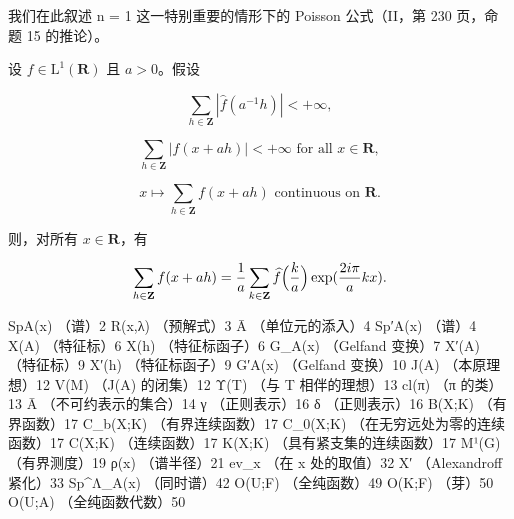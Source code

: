 
我们在此叙述 n = 1 这一特别重要的情形下的 Poisson 公式（II，第 230 页，命题 15 的推论）。

设 \(f\in \mathrm{L}^1 (\mathbf{R})\) 且 \(a > 0\)。假设

\[
\sum_ {h \in \mathbf {Z}} | \widehat {f} (a ^ {- 1} h) | <   + \infty ,
\]

\[
\sum_ {h \in \mathbf {Z}} | f (x + a h) | <   + \infty \text {   for all   } x \in \mathbf {R},
\]

\[
x \mapsto \sum_ {h \in \mathbf {Z}} f (x + a h) \text {   continuous   on   } \mathbf {R}.
\]

则，对所有 \(x \in \mathbf{R}\)，有

\[
\sum_ {h \in {\bf Z}} f (x + a h) = \frac {1}{a} \sum_ {k \in {\bf Z}} \widehat {f} \Bigl (\frac {k}{a} \Bigr) \exp (\frac {2 i \pi}{a} k x).
\]


SpA(x) （谱）2 R(x,λ) （预解式）3 Ā （单位元的添入）4 Sp′A(x) （谱）4 X(A) （特征标）6 X(h) （特征标函子）6 G\_A(x) （Gelfand 变换）7 X′(A) （特征标）9 X′(h) （特征标函子）9 G′A(x) （Gelfand 变换）10 J(A) （本原理想）12 V(M) （J(A) 的闭集）12 Υ(T) （与 T 相伴的理想）13 cl(π) （π 的类）13 Ā （不可约表示的集合）14 γ （正则表示）16 δ （正则表示）16 B(X;K) （有界函数）17 C\_b(X;K) （有界连续函数）17 C\_0(X;K) （在无穷远处为零的连续函数）17 C(X;K) （连续函数）17 K(X;K) （具有紧支集的连续函数）17 M¹(G) （有界测度）19 ρ(x) （谱半径）21 ev\_x （在 x 处的取值）32 X′ （Alexandroff 紧化）33 Sp\^{}Λ\_A(x) （同时谱）42 O(U;F) （全纯函数）49 O(K;F) （芽）50 O(U;A) （全纯函数代数）50



